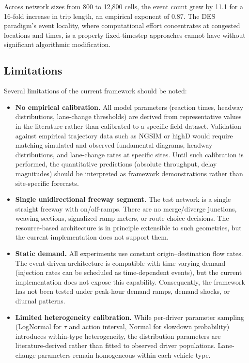 \documentclass[review,authoryear]{elsarticle}
\begin{document}
Across network sizes from 800 to 12{,}800 cells, the event count grew by 11.1 for a 16-fold increase in trip length, an empirical exponent of 0.87. The DES paradigm's event locality, where computational effort concentrates at congested locations and times, is a property fixed-timestep approaches cannot have without significant algorithmic modification.

\subsection{Limitations}

Several limitations of the current framework should be noted:

\begin{itemize}
    \item \textbf{No empirical calibration.} All model parameters (reaction times, headway distributions, lane-change thresholds) are derived from representative values in the literature rather than calibrated to a specific field dataset. Validation against empirical trajectory data such as NGSIM or highD would require matching simulated and observed fundamental diagrams, headway distributions, and lane-change rates at specific sites. Until such calibration is performed, the quantitative predictions (absolute throughput, delay magnitudes) should be interpreted as framework demonstrations rather than site-specific forecasts.

    \item \textbf{Single unidirectional freeway segment.} The test network is a single straight freeway with on/off-ramps. There are no merge/diverge junctions, weaving sections, signalized ramp meters, or route-choice decisions. The resource-based architecture is in principle extensible to such geometries, but the current implementation does not support them.

    \item \textbf{Static demand.} All experiments use constant origin--destination flow rates. The event-driven architecture is compatible with time-varying demand (injection rates can be scheduled as time-dependent events), but the current implementation does not expose this capability. Consequently, the framework has not been tested under peak-hour demand ramps, demand shocks, or diurnal patterns.

    \item \textbf{Limited heterogeneity calibration.} While per-driver parameter sampling (LogNormal for $\tau$ and action interval, Normal for slowdown probability) introduces within-type heterogeneity, the distribution parameters are literature-derived rather than fitted to observed driver populations. Lane-change parameters remain homogeneous within each vehicle type.


\end{itemize}
\end{document}
